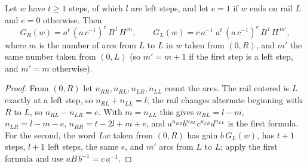 \begin{lemma}\label{lem:wordgain}
Let $w$ have $t\ge1$ steps, of which $l$ are left steps, and let $e=1$ if $w$ ends on rail $L$ and $e=0$ otherwise. Then
\[
G_R(w)=a^{t}\,(a\,c^{-1})^{e}\,B^{\,l}\,H^{\,m},\qquad G_L(w)=c\,a^{-1}\;a^{t}\,(a\,c^{-1})^{e}\,B^{\,l}\,H^{\,m'},
\]
where $m$ is the number of arcs from $L$ to $L$ in $w$ taken from $(0,R)$, and $m'$ the same number taken from $(0,L)$ (so $m'=m+1$ if the first step is a left step, and $m'=m$ otherwise).
\end{lemma}
\begin{proof}
From $(0,R)$ let $n_{RR},n_{RL},n_{LR},n_{LL}$ count the arcs. The rail entered is $L$ exactly at a left step, so $n_{RL}+n_{LL}=l$; the rail changes alternate beginning with $R$ to $L$, so $n_{RL}-n_{LR}=e$. With $m=n_{LL}$ this gives $n_{RL}=l-m$, $n_{LR}=l-m-e$, $n_{RR}=t-2l+m+e$, and $a^{n_{RR}}b^{n_{RL}}c^{n_{LR}}d^{n_{LL}}$ is the first formula. For the second, the word $Lw$ taken from $(0,R)$ has gain $b\,G_L(w)$, has $t+1$ steps, $l+1$ left steps, the same $e$, and $m'$ arcs from $L$ to $L$; apply the first formula and use $aB\,b^{-1}=c\,a^{-1}$.
\end{proof}

